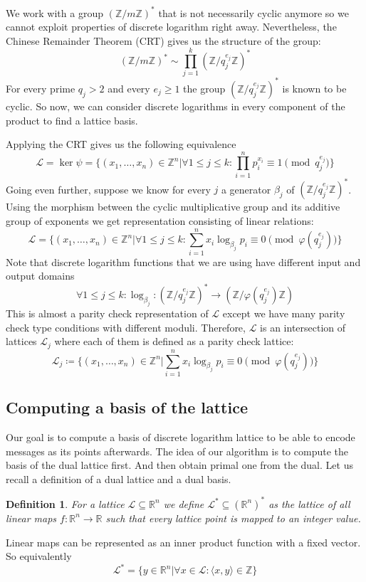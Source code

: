 \documentclass[12pt]{article}
\newcommand{\ZZ}{\mathbb{Z}}
\newcommand{\LL}{\mathcal{L}}
\newtheorem{definition}{Definition}
\begin{document}
We work with a group $(\ZZ/m\ZZ)^*$ that is not necessarily cyclic anymore so we cannot exploit properties of discrete logarithm right away. Nevertheless, the Chinese Remainder Theorem (CRT) gives us the structure of the group:
\[
   (\ZZ/m\ZZ)^* \sim \prod_{j=1}^{k}(\ZZ/q_{j}^{e_{j}}\ZZ)^*
\]
For every prime $q_{j} > 2$ and every $e_{j} \geq 1$ the group $(\ZZ/q_{j}^{e_{j}}\ZZ)^*$ is known to be cyclic. So now, we can consider discrete logarithms in every component of the product to find a lattice basis.

Applying the CRT gives us the following equivalence
\[
    \LL = \ker \psi = \{(x_{1}, \dots, x_{n}) \in \ZZ^{n} |  \forall 1 \leq j \leq k: \prod_{i=1}^{n}p_{i}^{x_{i}} \equiv 1 \pmod{q_{j}^{e_{j}}}\}
\]
Going even further, suppose we know for every $j$ a generator ${\beta_{j}}$ of  $(\ZZ/q_{j}^{e_{j}}\ZZ)^*$. Using the morphism between the cyclic multiplicative group and its additive group of exponents we get representation consisting of linear relations:
\[
    \LL = \{(x_{1}, \dots, x_{n}) \in \ZZ^{n} |  \forall 1 \leq j \leq k: \sum_{i=1}^{n}x_{i}\log_{\beta_{j}}p_{i}\equiv 0 \pmod{\varphi(q_{j}^{e_{j}})}\}
\]
Note that discrete logarithm functions that we are using have different input and output domains
\[
    \forall 1 \leq j \leq k: \log_{\beta_{j}}: (\ZZ/q_{j}^{e_{j}}\ZZ)^* \rightarrow (\ZZ/\varphi(q_{j}^{e_{j}})\ZZ)
\]
This is almost a parity check representation of $\LL$ except we have many parity check type conditions with different moduli. Therefore, $\LL$ is an intersection of lattices $\LL_{j}$ where each of them is defined as a parity check lattice:
\[
\label{parity check}
    \LL_{j} \coloneqq \{(x_{1}, \dots, x_{n}) \in \ZZ^{n} | \sum_{i=1}^{n}x_{i}\log_{\beta_{j}}p_{i}\equiv 0 \pmod{\varphi(q_{j}^{e_{j}})}\}
\]


\subsection{Computing a basis of the lattice}
\label{subsec:compute_basis_integers}


Our goal is to compute a basis of discrete logarithm lattice to be able to encode messages as its points afterwards. The idea of our algorithm is to compute the basis of the dual lattice first. And then obtain primal one from the dual.
Let us recall a definition of a dual lattice and a dual basis.
\begin{definition}
    For a lattice $\LL \subseteq \mathbb{R}^{n}$ we define $\LL^{*} \subseteq (\mathbb{R}^{n})^{*}$ as the lattice of all linear maps $f:\mathbb{R}^{n} \rightarrow \mathbb{R}$ such that every lattice point is mapped to an integer value.
\end{definition}
Linear maps can be represented as an inner product function with a fixed vector. So equivalently
\[
    \LL^{*} = \{y \in \mathbb{R}^{n} | \forall x \in \LL:  \langle x,y\rangle \in \ZZ \}
\]
\end{document}
